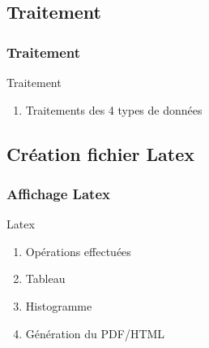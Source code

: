 \documentclass{beamer}
\begin{document}
\subsection{Traitement}
\begin{frame}[label=Traitement]
\frametitle{Traitement}
\begin{beamerboxesrounded}[shadow=true]{Traitement}
		\begin{enumerate}
			\item Traitements des 4 types de données
	
		\end{enumerate}
\end{beamerboxesrounded}
\end{frame}


\subsection{Création fichier Latex}
\begin{frame}[label=Création fichier Latex]
\frametitle{Affichage Latex}
\begin{beamerboxesrounded}[shadow=true]{Latex}
		\begin{enumerate}
			\item Opérations effectuées
			\item Tableau
			\item Histogramme
			\item Génération du PDF/HTML
		\end{enumerate}
\end{beamerboxesrounded}
\end{frame}




\end{document}
